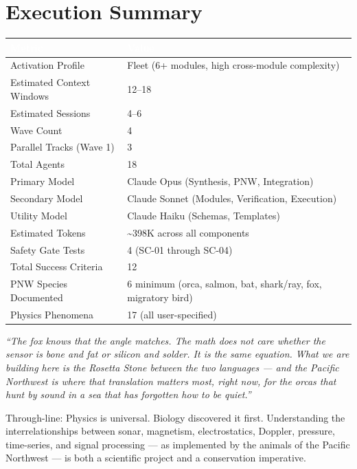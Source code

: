 \documentclass[11pt,letterpaper]{article}
\newcommand{\tableheader}[1]{\textbf{\sffamily\textcolor{white}{#1}}}
\begin{document}
\section{Execution Summary}

\begin{center}
\begin{tabularx}{\textwidth}{L{4cm}X}
\toprule
{}
\tableheader{Metric} & \tableheader{Value} \\
\midrule
Activation Profile & Fleet (6+ modules, high cross-module complexity) \\
Estimated Context Windows & 12--18 \\
Estimated Sessions & 4--6 \\
Wave Count & 4 \\
Parallel Tracks (Wave 1) & 3 \\
Total Agents & 18 \\
Primary Model & Claude Opus (Synthesis, PNW, Integration) \\
Secondary Model & Claude Sonnet (Modules, Verification, Execution) \\
Utility Model & Claude Haiku (Schemas, Templates) \\
Estimated Tokens & \textasciitilde 398K across all components \\
Safety Gate Tests & 4 (SC-01 through SC-04) \\
Total Success Criteria & 12 \\
PNW Species Documented & 6 minimum (orca, salmon, bat, shark/ray, fox, migratory bird) \\
Physics Phenomena & 17 (all user-specified) \\
\bottomrule
\end{tabularx}
\end{center}

\vspace{2em}

\begin{quotebox}
\textit{``The fox knows that the angle matches. The math does not care whether the sensor is bone and fat or silicon and solder. It is the same equation. What we are building here is the Rosetta Stone between the two languages --- and the Pacific Northwest is where that translation matters most, right now, for the orcas that hunt by sound in a sea that has forgotten how to be quiet.''}

\vspace{0.5em}
\noindent Through-line: Physics is universal. Biology discovered it first. Understanding the interrelationships between sonar, magnetism, electrostatics, Doppler, pressure, time-series, and signal processing --- as implemented by the animals of the Pacific Northwest --- is both a scientific project and a conservation imperative.
\end{quotebox}
\end{document}
